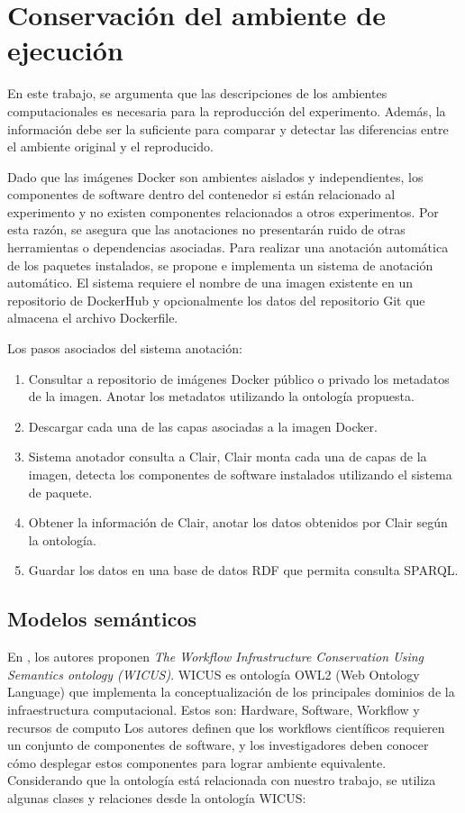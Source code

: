\chapter{Conservación del ambiente de ejecución}

En este trabajo, se argumenta que las descripciones de los ambientes computacionales es necesaria para la reproducción  del experimento. Además, la información debe ser la suficiente para comparar y detectar las diferencias entre el ambiente original y el reproducido.

Dado que las imágenes Docker son ambientes aislados y independientes, los componentes de software dentro del contenedor si están relacionado al experimento y no existen componentes relacionados a otros experimentos.
Por esta razón, se asegura que las anotaciones no presentarán ruido de otras herramientas o dependencias asociadas.
Para realizar una anotación automática de los paquetes instalados, se propone e implementa un sistema de anotación automático. El sistema requiere el nombre de una imagen existente en un repositorio de DockerHub y opcionalmente los datos del repositorio Git que almacena el archivo Dockerfile. 

Los pasos asociados del sistema anotación:

\begin{enumerate}
	\item Consultar a repositorio de imágenes Docker público o privado los metadatos de la imagen. Anotar los metadatos utilizando la ontología propuesta.
	\item Descargar cada una de las capas asociadas a la imagen Docker.
	\item Sistema anotador consulta a Clair, Clair monta cada una de capas de la imagen, detecta los componentes de software instalados utilizando el sistema de paquete.
	\item Obtener la información de Clair, anotar los datos obtenidos por Clair según la ontología.
	\item Guardar los datos en una base de datos RDF que permita consulta SPARQL.
\end{enumerate} 

\section{Modelos semánticos}\label{s4.1}
     
En \cite{santana2017reproducibility}, los autores proponen \emph{The Workflow Infrastructure Conservation Using Semantics ontology (WICUS)}. WICUS es ontología OWL2 (Web Ontology Language) que implementa la conceptualización de los principales dominios de la infraestructura computacional. Estos son: Hardware, Software, Workflow y recursos de computo
Los autores definen que los workflows científicos requieren un conjunto de componentes de software, y los investigadores deben conocer cómo desplegar estos componentes para lograr ambiente equivalente.
Considerando que la ontología está relacionada con nuestro trabajo, se utiliza algunas clases y relaciones desde la ontología WICUS:

